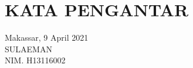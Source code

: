 \chapter*{KATA PENGANTAR}

\blindtext

\vspace{1cm}
\begin{flushright}
    Makassar, 9 April 2021\\
    \vspace{2.5cm}
    {SULAEMAN}\\
    NIM. {H13116002}
\end{flushright}

